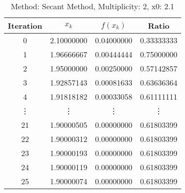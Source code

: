 \begin{table}
\centering
\caption{Method: Secant Method, Multiplicity: 2, x0: 2.1}
\label{tab:table_Secant_Method_2_2_1}
\begin{tabular}{c c c c}
\toprule
Iteration &      $x_k$ &   $f(x_k)$ &      Ratio \\
\midrule
        0 & 2.10000000 & 0.04000000 & 0.33333333 \\
        1 & 1.96666667 & 0.00444444 & 0.75000000 \\
        2 & 1.95000000 & 0.00250000 & 0.57142857 \\
        3 & 1.92857143 & 0.00081633 & 0.63636364 \\
        4 & 1.91818182 & 0.00033058 & 0.61111111 \\
   \vdots &     \vdots &     \vdots &     \vdots \\
       21 & 1.90000505 & 0.00000000 & 0.61803399 \\
       22 & 1.90000312 & 0.00000000 & 0.61803399 \\
       23 & 1.90000193 & 0.00000000 & 0.61803399 \\
       24 & 1.90000119 & 0.00000000 & 0.61803399 \\
       25 & 1.90000074 & 0.00000000 & 0.61803399 \\
\bottomrule
\end{tabular}
\end{table}
